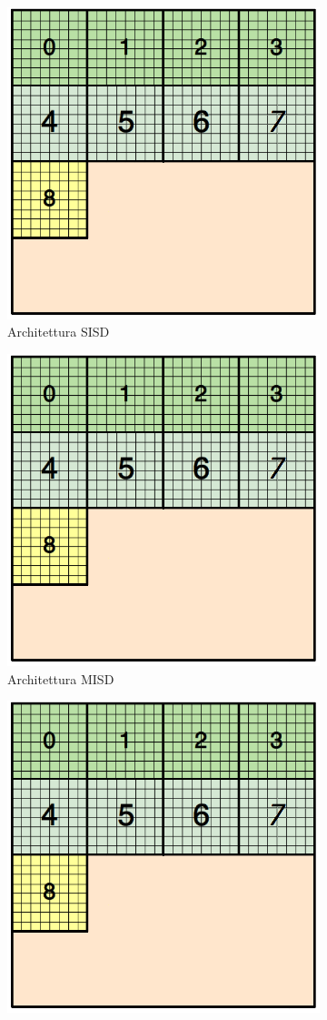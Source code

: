 \begin{figure}[H]
	\centering
	\begin{subfigure}{.5\textwidth}
		\centering
		\includegraphics[width=0.45\linewidth]{immagini/block_on_grid.png}
		\caption{Architettura SISD\newline}
		\label{fig:sisd}
	\end{subfigure}%
	\begin{subfigure}{.5\textwidth}
		\centering
		\includegraphics[width=0.45\linewidth]{immagini/block_on_grid.png}
		\caption{Architettura MISD\newline}
		\label{fig:misd}
	\end{subfigure}
	\label{fig:test}
	\begin{subfigure}{.5\textwidth}
		\centering
		\includegraphics[width=0.45\linewidth]{immagini/block_on_grid.png}

\end{subfigure}
\end{figure}
